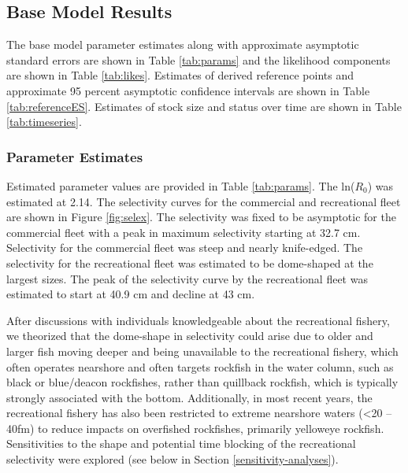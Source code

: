 \documentclass[11pt,
  english,
  a4paper,
]{article}
\begin{document}
\hypertarget{base-model-results}{%
\subsection{Base Model Results}\label{base-model-results}}

\leavevmode\tagmcend\tagstructend


The base model parameter estimates along with approximate asymptotic standard errors are shown in Table \ref{tab:params} and the likelihood components are shown in Table \ref{tab:likes}. Estimates of derived reference points and approximate 95 percent asymptotic confidence intervals are shown in Table \ref{tab:referenceES}. Estimates of stock size and status over time are shown in Table \ref{tab:timeseries}.

\leavevmode\tagmcend\tagstructend\par


\hypertarget{parameter-estimates}{%
\subsubsection{Parameter Estimates}\label{parameter-estimates}}

\leavevmode\tagmcend\tagstructend


Estimated parameter values are provided in Table \ref{tab:params}. The ln({\(R_0\)\leavevmode\tagmcend\tagstructend}) was estimated at 2.14. The selectivity curves for the commercial and recreational fleet are shown in Figure \ref{fig:selex}. The selectivity was fixed to be asymptotic for the commercial fleet with a peak in maximum selectivity starting at 32.7 cm. Selectivity for the commercial fleet was steep and nearly knife-edged. The selectivity for the recreational fleet was estimated to be dome-shaped at the largest sizes. The peak of the selectivity curve by the recreational fleet was estimated to start at 40.9 cm and decline at 43 cm.

\leavevmode\tagmcend\tagstructend\par


After discussions with individuals knowledgeable about the recreational fishery, we theorized that the dome-shape in selectivity could arise due to older and larger fish moving deeper and being unavailable to the recreational fishery, which often operates nearshore and often targets rockfish in the water column, such as black or blue/deacon rockfishes, rather than quillback rockfish, which is typically strongly associated with the bottom. Additionally, in most recent years, the recreational fishery has also been restricted to extreme nearshore waters (\textless20 -- 40fm) to reduce impacts on overfished rockfishes, primarily yelloweye rockfish. Sensitivities to the shape and potential time blocking of the recreational selectivity were explored (see below in Section \ref{sensitivity-analyses}).
\end{document}
